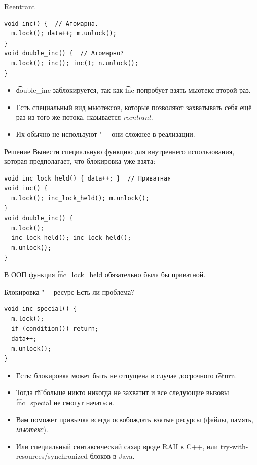 \begin{frame}[fragile]{Reentrant}
\begin{verbatim}
void inc() {  // Атомарна.
  m.lock(); data++; m.unlock();
}
void double_inc() {  // Атомарно?
  m.lock(); inc(); inc(); n.unlock();
}
\end{verbatim}
	\begin{itemize}
		\item \t{double\_inc} заблокируется, так как \t{inc} попробует взять мьютекс второй раз.
		\item Есть специальный вид мьютексов, которые позволяют захватывать себя ещё раз из того же потока, называется \textit{reentrant}.
		\item Их обычно не используют "--- они сложнее в реализации.
	\end{itemize}
\end{frame}

\begin{frame}[fragile]{Решение}
	Вынести специальную функцию для внутреннего использования, которая предполагает, что блокировка уже взята:
\begin{verbatim}
void inc_lock_held() { data++; }  // Приватная
void inc() {
  m.lock(); inc_lock_held(); m.unlock();
}
void double_inc() {
  m.lock();
  inc_lock_held(); inc_lock_held();
  m.unlock();
}
\end{verbatim}
	В ООП функция \t{inc\_lock\_held} обязательно была бы приватной.
\end{frame}

\begin{frame}[fragile]{Блокировка "--- ресурс}
	Есть ли проблема?
\begin{verbatim}
void inc_special() {
  m.lock();
  if (condition()) return;
  data++;
  m.unlock();
}
\end{verbatim}
	\pause
	\begin{itemize}
		\item Есть: блокировка может быть не отпущена в случае досрочного \t{return}.
		\item Тогда \t{m} больше никто никогда не захватит и все следующие вызовы \t{inc\_special} не смогут начаться.
		\item Вам поможет привычка всегда освобождать взятые ресурсы (файлы, память, \textit{мьютекс}).
		\item Или специальный синтаксический сахар вроде RAII в C++, или try-with-resources/synchronized-блоков в Java.
	\end{itemize}
\end{frame}

